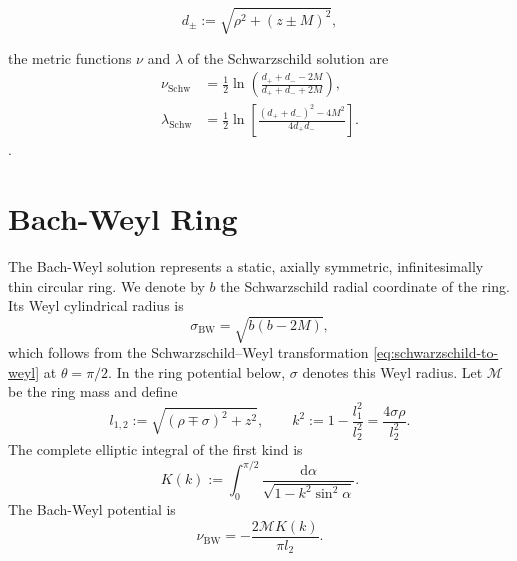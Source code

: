\begin{equation}
    d_{\pm}
    :=
    \sqrt{\rho^2+(z\pm M)^2},
    \label{eq:schwarzschild-distances}
\end{equation}

the metric functions $\nu$ and $\lambda$ of the Schwarzschild solution are
\begin{align}
    \nu_{\mathrm{Schw}}
    &=
    \frac{1}{2}
    \ln
    \left(
        \frac{d_{+}+d_{-}-2M}
             {d_{+}+d_{-}+2M}
    \right),
    \label{eq:schwarzschild-potential}
    \\
    \lambda_{\mathrm{Schw}}
    &=
    \frac{1}{2}
    \ln
    \left[
        \frac{(d_{+}+d_{-})^2-4M^2}
             {4d_{+}d_{-}}
    \right].
    \label{eq:schwarzschild-lambda}
\end{align}
\cite{Kraus2025}.

\section{Bach-Weyl Ring}
\label{sec:bach-weyl-ring}

The Bach-Weyl solution represents a static, axially symmetric,
infinitesimally thin circular ring. We denote by \(b\) the Schwarzschild
radial coordinate of the ring. Its Weyl
cylindrical radius is
\begin{equation}
    \sigma_{\mathrm{BW}}
    =
    \sqrt{b(b-2M)},
    \label{eq:schw-bw-ring-radius}
\end{equation}
which follows from the Schwarzschild--Weyl transformation
\eqref{eq:schwarzschild-to-weyl} at \(\theta=\pi/2\). In the ring potential
below, \(\sigma\) denotes this Weyl radius. Let \(\mathcal{M}\) be the ring
mass and define
\begin{equation}
    l_{1,2}
    :=
    \sqrt{(\rho\mp \sigma)^2+z^2},
    \qquad
    k^2
    :=
    1-\frac{l_1^2}{l_2^2}
    =
    \frac{4\sigma\rho}{l_2^2}.
    \label{eq:ring-quantities}
\end{equation}
The complete elliptic integral of the first kind is
\begin{equation}
    K(k)
    :=
    \int_0^{\pi/2}
    \frac{\mathrm{d}\alpha}
         {\sqrt{1-k^2\sin^2\alpha}}.
    \label{eq:complete-elliptic-k}
\end{equation}
The Bach-Weyl potential is
\begin{equation}
    \nu_{\mathrm{BW}}
    =
    -\frac{2\mathcal{M}K(k)}{\pi l_2}.
    \label{eq:bw-potential}
\end{equation}

